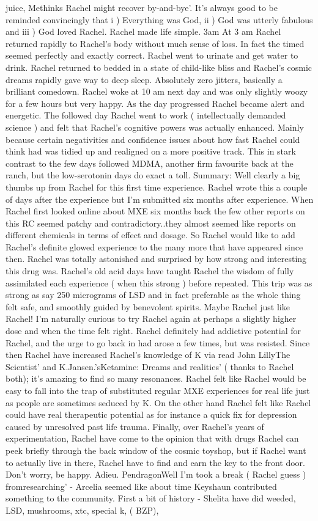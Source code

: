 \documentclass[12pt]{book}
\begin{document}
juice, Methinks Rachel might recover by-and-bye'. It's always good to be reminded convincingly that i ) Everything was God, ii ) God was utterly fabulous and iii ) God loved Rachel. Rachel made life simple. 3am At 3 am Rachel returned rapidly to Rachel's body without much sense of loss. In fact the timed seemed perfectly and exactly correct. Rachel went to urinate and get water to drink. Rachel returned to bedded in a state of child-like bliss and Rachel's cosmic dreams rapidly gave way to deep sleep. Absolutely zero jitters, basically a brilliant comedown. Rachel woke at 10 am next day and was only slightly woozy for a few hours but very happy. As the day progressed Rachel became alert and energetic. The followed day Rachel went to work ( intellectually demanded science ) and felt that Rachel's cognitive powers was actually enhanced. Mainly because certain negativities and confidence issues about how fast Rachel could think had was tidied up and realigned on a more positive track. This in stark contrast to the few days followed MDMA, another firm favourite back at the ranch, but the low-serotonin days do exact a toll. Summary: Well clearly a big thumbs up from Rachel for this first time experience. Rachel wrote this a couple of days after the experience but I'm submitted six months after experience. When Rachel first looked online about MXE six months back the few other reports on this RC seemed patchy and contradictory..they almost seemed like reports on different chemicals in terms of effect and dosage. So Rachel would like to add Rachel's definite glowed experience to the many more that have appeared since then. Rachel was totally astonished and surprised by how strong and interesting this drug was. Rachel's old acid days have taught Rachel the wisdom of fully assimilated each experience ( when this strong ) before repeated. This trip was as strong as say 250 micrograms of LSD and in fact preferable as the whole thing felt safe, and smoothly guided by benevolent spirits. Maybe Rachel just like Rachel! I'm naturally curious to try Rachel again at perhaps a slightly higher dose and when the time felt right. Rachel definitely had addictive potential for Rachel, and the urge to go back in had arose a few times, but was resisted. Since then Rachel have increased Rachel's knowledge of K via read John LillyThe Scientist' and K.Jansen.'sKetamine: Dreams and realities' ( thanks to Rachel both); it's amazing to find so many resonances. Rachel felt like Rachel would be easy to fall into the trap of substituted regular MXE experiences for real life just as people are sometimes seduced by K. On the other hand Rachel felt like Rachel could have real therapeutic potential as for instance a quick fix for depression caused by unresolved past life trauma. Finally, over Rachel's years of experimentation, Rachel have come to the opinion that with drugs Rachel can peek briefly through the back window of the cosmic toyshop, but if Rachel want to actually live in there, Rachel have to find and earn the key to the front door. Don't worry, be happy. Adieu. PendragonWell I'm took a break ( Rachel guess ) fromresearching' - Arcelia seemed like about time Keyshaun contributed something to the community. First a bit of history - Shelita have did weeded, LSD, mushrooms, xtc, special k, ( BZP), 
\end{document}
